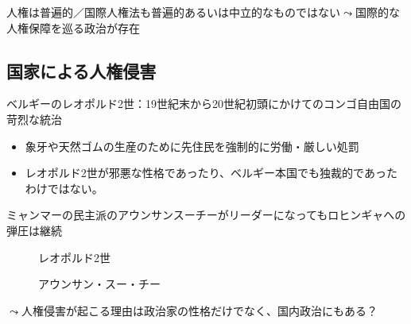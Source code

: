 \documentclass[
  xelatex,
  ja=standard]{bxjsarticle}
\providecommand{\tightlist}{%
  \setlength{\itemsep}{0pt}\setlength{\parskip}{0pt}}\usepackage{longtable,booktabs,array}
\begin{document}
人権は普遍的／国際人権法も普遍的あるいは中立的なものではない\(\leadsto\)国際的な人権保障を巡る政治が存在

\hypertarget{ux56fdux5bb6ux306bux3088ux308bux4ebaux6a29ux4fb5ux5bb3}{%
\subsection{国家による人権侵害}\label{ux56fdux5bb6ux306bux3088ux308bux4ebaux6a29ux4fb5ux5bb3}}

ベルギーのレオポルド2世：19世紀末から20世紀初頭にかけてのコンゴ自由国の苛烈な統治

\begin{itemize}
\tightlist
\item
  象牙や天然ゴムの生産のために先住民を強制的に労働・厳しい処罰
\item
  レオポルド2世が邪悪な性格であったり、ベルギー本国でも独裁的であったわけではない。
\end{itemize}

ミャンマーの民主派のアウンサンスーチーがリーダーになってもロヒンギャへの弾圧は継続

\begin{figure}

\begin{minipage}[t]{0.50\linewidth}

{\centering 


\caption{レオポルド2世}

}

\end{minipage}%
%
\begin{minipage}[t]{0.50\linewidth}

{\centering 


\caption{アウンサン・スー・チー}

}

\end{minipage}%

\end{figure}

\(\leadsto\)人権侵害が起こる理由は政治家の性格だけでなく、国内政治にもある？
\end{document}
